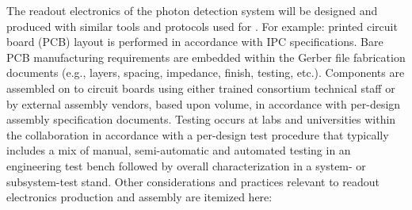 The readout electronics of the photon detection system will be designed and produced with similar tools and protocols used for  . For example: printed circuit board (PCB) layout is performed in accordance with IPC specifications. Bare PCB manufacturing requirements are embedded within the Gerber file fabrication documents (e.g., layers, spacing, impedance, finish, testing, etc.). Components are assembled on to circuit boards using either trained  consortium technical staff or by external assembly vendors, based upon volume, in accordance with per-design assembly specification documents. Testing occurs at labs and universities within the collaboration in accordance with a per-design test procedure that typically includes a mix of manual, semi-automatic and automated testing in an engineering test bench followed by overall characterization in a system- or subsystem-test stand.
Other considerations and practices relevant to readout electronics production and assembly are itemized here:

